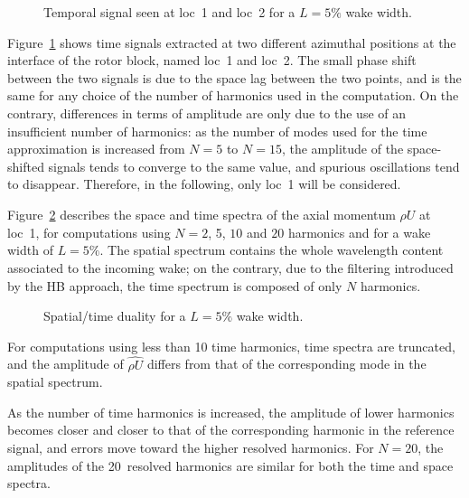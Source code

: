\begin{figure}[htp]
\centering
  \caption{Temporal signal seen at loc~1 and loc~2 for a $L=5\%$ wake width.}
  \label{fig:temp_signal}
\end{figure}
Figure~\ref{fig:temp_signal} shows time signals
extracted at two different azimuthal positions at 
the interface of the rotor block, named loc~1 and loc~2. 
The small phase shift between the two 
signals is due to the space lag between the two points, 
and is the same for any choice of the number of 
harmonics used in the computation. On the contrary, 
differences in terms of amplitude are only due 
to the use of an insufficient number of harmonics: 
as the number of modes used for the time 
approximation is increased from $N=5$ to $N=15$, 
the amplitude of the space-shifted signals 
tends to converge to the same value, and 
spurious oscillations tend to disappear. Therefore, in the following,
only loc~1 will be considered.

Figure~\ref{fig:dualite_crit} describes the space and 
time spectra of the axial momentum $\widehat{\rho U}$ at loc~1, 
for computations using $N=2$, 5, $10$ and $20$ 
harmonics and for a wake width of $L=5\%$.
The spatial spectrum contains the whole wavelength 
content associated to the incoming wake; 
on the contrary, due to the filtering introduced 
by the HB approach, the time spectrum is composed of only $N$ harmonics.
\begin{figure}[htp]
\centering
{}
\caption{Spatial/time duality for a $L=5\%$ wake width.}
\label{fig:dualite_crit}
\end{figure}

For computations using less than 10 time harmonics, 
time spectra are truncated, and the amplitude of 
$\widehat{\rho U}$ differs from that of the corresponding mode in the spatial spectrum.

As the number of time harmonics is increased, 
the amplitude of lower harmonics becomes closer 
and closer to that of the corresponding harmonic 
in the reference signal, and errors move toward 
the higher resolved harmonics. For $N=20$, 
the amplitudes of the 20~resolved harmonics are 
similar for both the time and space spectra.

